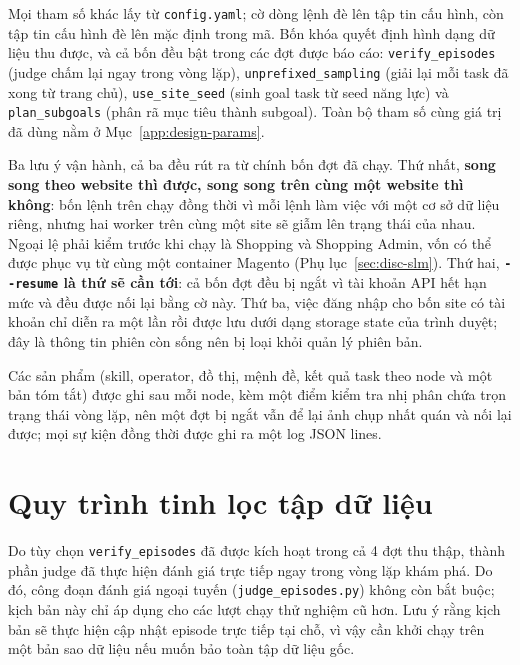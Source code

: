 \noindent
Mọi tham số khác lấy từ \texttt{config.yaml}; cờ dòng lệnh đè lên tập tin cấu
hình, còn tập tin cấu hình đè lên mặc định trong mã. Bốn khóa quyết định hình
dạng dữ liệu thu được, và cả bốn đều bật trong các đợt được báo cáo:
\texttt{verify\_episodes} (judge chấm lại ngay trong vòng lặp),
\texttt{unprefixed\_sampling} (giải lại mỗi task đã xong từ trang chủ),
\texttt{use\_site\_seed} (sinh goal task từ seed năng lực) và
\texttt{plan\_subgoals} (phân rã mục tiêu thành subgoal). Toàn bộ tham số cùng
giá trị đã dùng nằm ở Mục~\ref{app:design-params}.

Ba lưu ý vận hành, cả ba đều rút ra từ chính bốn đợt đã chạy. Thứ nhất,
\textbf{song song theo website thì được, song song trên cùng một website thì
không}: bốn lệnh trên chạy đồng thời vì mỗi lệnh làm việc với một cơ sở dữ
liệu riêng, nhưng hai worker trên cùng một site sẽ giẫm lên trạng thái của
nhau. Ngoại lệ phải kiểm trước khi chạy là Shopping và Shopping Admin, vốn có
thể được phục vụ từ cùng một container Magento
(Phụ lục~\ref{sec:disc-slm}). Thứ hai, \textbf{\texttt{-{}-resume} là thứ sẽ cần
tới}: cả bốn đợt đều bị ngắt vì tài khoản API hết hạn mức và đều được nối lại
bằng cờ này. Thứ ba, việc đăng nhập cho bốn site có tài khoản chỉ diễn ra một
lần rồi được lưu dưới dạng storage state của trình duyệt; đây là thông tin
phiên còn sống nên bị loại khỏi quản lý phiên bản.

Các sản phẩm (skill, operator, đồ thị, mệnh đề, kết quả task theo node và một
bản tóm tắt) được ghi sau mỗi node, kèm một điểm kiểm tra nhị phân chứa trọn
trạng thái vòng lặp, nên một đợt bị ngắt vẫn để lại ảnh chụp nhất quán và nối
lại được; mọi sự kiện đồng thời được ghi ra một log JSON lines.

\section{Quy trình tinh lọc tập dữ liệu}
\label{app:repro-curate}

Do tùy chọn \texttt{verify\_episodes} đã được kích hoạt trong cả 4 đợt thu thập,
thành phần judge đã thực hiện đánh giá trực tiếp ngay trong vòng lặp khám phá.
Do đó, công đoạn đánh giá ngoại tuyến (\texttt{judge\_episodes.py}) không còn
bắt buộc; kịch bản này chỉ áp dụng cho các lượt chạy thử nghiệm cũ hơn. Lưu ý
rằng kịch bản sẽ thực hiện cập nhật episode trực tiếp tại chỗ, vì vậy
cần khởi chạy trên một bản sao dữ liệu nếu muốn bảo toàn tập dữ liệu gốc.

